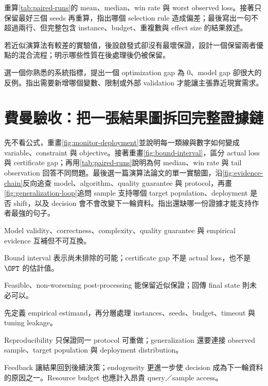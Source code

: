 \documentclass[11pt,a4paper,oneside,openany]{book}
\begin{document}
\begin{exercise}
重算\cref{tab:paired-runs}的 mean、median、win rate 與 worst observed loss。接著只保留最好三個 seeds 再重算，指出哪個 selection rule 造成偏差；最後寫出一句不超過兩行、但完整包含 instance、budget、重複數與 effect size 的結果敘述。
\end{exercise}
\begin{exercise}
若近似演算法有較差的實驗值，後設啟發式卻沒有最壞保證，設計一個保留兩者優點的混合流程；明示哪些性質在後處理後仍被保留。
\end{exercise}
\begin{exercise}
選一個你熟悉的系統指標，提出一個 optimization gap 為 0、model gap 卻很大的反例。指出需要新增哪個變數、限制或外部 validation 才能讓主張靠近現實需求。
\end{exercise}

\section{費曼驗收：把一張結果圖拆回完整證據鏈}
\begin{feynmancheck}
先不看公式，重畫\cref{fig:monitor-deployment}並說明每一類線與數字如何變成 variable、constraint 與 objective。接著重畫\cref{fig:bound-interval}，區分 actual loss 與 certificate gap；再用\cref{tab:paired-runs}說明為何 median、win rate 與 tail observation 回答不同問題。最後選一篇演算法論文的單一實驗圖，沿\cref{fig:evidence-chain}反向追查 model、algorithm、quality guarantee 與 protocol，再畫\cref{fig:generalization-loop}追問 sample 支持哪個 target population、deployment 是否 shift，以及 decision 會不會改變下一輪資料。指出還缺哪一份證據才能支持作者最強的句子。
\end{feynmancheck}
\begin{chapterrecap}
\item Model validity、correctness、complexity、quality guarantee 與 empirical evidence 互補但不可互換。
\item Bound interval 表示尚未排除的可能；certificate gap 不是 actual loss，也不是 $\OPT$ 的估計值。
\item Feasible、non-worsening post-processing 能保留近似保證；回傳 final state 則未必可以。
\item 先定義 empirical estimand，再分層處理 instances、seeds、budget、timeout 與 tuning leakage。
\item Reproducibility 只保證同一 protocol 可重做；generalization 還要連接 observed sample、target population 與 deployment distribution。
\item Feedback 讓結果回到後續決策；endogeneity 更進一步使 decision 成為下一輪資料的原因之一。Resource budget 也應計入昂貴 query／sample access。
\end{chapterrecap}
\end{document}
